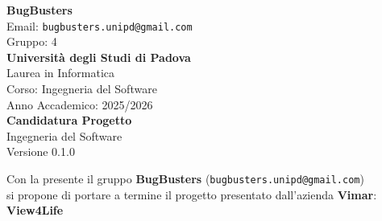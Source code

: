 \documentclass[a4paper,12pt]{article}
\newcommand{\CurrentVersion}{0.1.0} %
\begin{document}
\begin{center}
  
  {\Large\bfseries\color{primaryblue} BugBusters}\\[0.3cm]
  {\small\color{darkgray} Email: \texttt{bugbusters.unipd@gmail.com}} \\[0.1cm]
  {\small\color{darkgray} Gruppo: 4} \\[0.5cm]

  {\large\bfseries Università degli Studi di Padova}\\[0.3cm]
  {\small Laurea in Informatica}\\[0.2cm]
  {\small Corso: Ingegneria del Software}\\[0.2cm]
  {\small Anno Accademico: 2025/2026}\\[0.8cm]

  {\Huge\bfseries\color{primaryblue} Candidatura Progetto}\\[0.3cm]
  {\Large\color{secondaryblue} Ingegneria del Software}\\[0.8cm]
  {\Large\color{secondaryblue} Versione \CurrentVersion}\\[0.8cm]
\end{center}

\begin{center}
\begin{tcolorbox}[colback=secondaryblue!10,colframe=secondaryblue,width=0.9\textwidth,arc=3mm,boxrule=0.8pt]
\centering
Con la presente il gruppo \textbf{BugBusters} (\texttt{bugbusters.unipd@gmail.com}) \\
si propone di portare a termine il progetto presentato dall'azienda \textbf{Vimar}: \\[0.3cm]
{\Large\bfseries\color{primaryblue} View4Life}
\end{tcolorbox}
\end{center}
\end{document}
